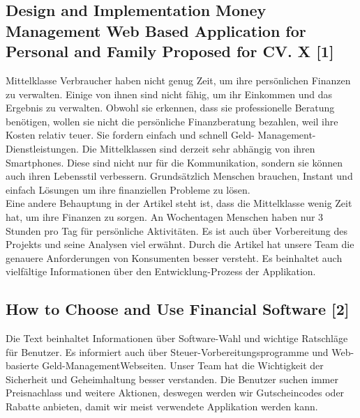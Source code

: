 \documentclass[runningheads,a4paper]{llncs}
\begin{document}
\subsection{Design and Implementation Money Management Web Based Application for Personal and Family Proposed for CV. X  [1]}
Mittelklasse Verbraucher haben nicht genug Zeit, um ihre persönlichen Finanzen zu verwalten. Einige von ihnen sind nicht fähig, um ihr Einkommen und das Ergebnis zu verwalten. Obwohl sie erkennen, dass sie professionelle Beratung benötigen, wollen sie nicht die persönliche Finanzberatung bezahlen, weil ihre Kosten relativ teuer. Sie fordern einfach und schnell Geld- Management- Dienstleistungen. Die Mittelklassen sind derzeit sehr abhängig von ihren Smartphones. Diese sind nicht nur für die Kommunikation, sondern sie können auch ihren Lebensstil verbessern. Grundsätzlich Menschen brauchen, Instant und einfach Lösungen um ihre finanziellen Probleme zu lösen.\\ Eine andere Behauptung in der Artikel steht ist, dass die Mittelklasse  wenig Zeit hat, um ihre Finanzen zu sorgen. An Wochentagen Menschen haben nur 3 Stunden pro Tag für persönliche Aktivitäten. Es ist auch über Vorbereitung des Projekts und seine Analysen viel erwähnt. Durch die Artikel hat unsere Team die genauere Anforderungen von Konsumenten besser versteht. Es beinhaltet auch vielfältige Informationen über den Entwicklung-Prozess der Applikation.     


\subsection{How to Choose and Use Financial Software [2]}
Die Text beinhaltet Informationen über Software-Wahl und wichtige Ratschläge für Benutzer. Es informiert auch über Steuer-Vorbereitungsprogramme und Web-basierte Geld-ManagementWebseiten. 
 Unser Team hat die Wichtigkeit der Sicherheit und Geheimhaltung besser verstanden. Die Benutzer suchen immer Preisnachlass und weitere Aktionen, deswegen werden wir Gutscheincodes oder Rabatte anbieten, damit wir meist verwendete Applikation werden kann.   
\end{document}
